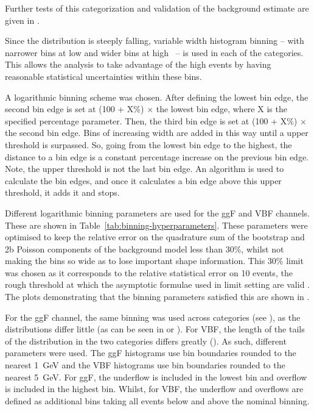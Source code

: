 Further tests of this categorization and validation of the background estimate are given in \Sect{\ref{sec:bkgvalidation}}.

Since the \mhh distribution is steeply falling, variable width histogram binning -- with narrower bins at low \mhh and wider bins at high \mhh\ -- is used in each of the categories. This allows the analysis to take advantage of the high \mhh events by having reasonable statistical uncertainties within these bins.

A logarithmic binning scheme was chosen. After defining the lowest bin edge, the second bin edge is set at (100 + X\%) $\times$ the lowest bin edge, where X is the specified percentage parameter. Then, the third bin edge is set at (100 + X\%) $\times$ the second bin edge. Bins of increasing width are added in this way until a upper threshold is surpassed. So, going from the lowest bin edge to the highest, the distance to a bin edge is a constant percentage increase on the previous bin edge. Note, the upper threshold is not the last bin edge. An algorithm is used to calculate the bin edges, and once it calculates a bin edge above this upper threshold, it adds it and stops.

Different logarithmic binning parameters are used for the ggF and VBF channels. These are shown in Table~\ref{tab:binning-hyperparameters}. These parameters were optimised to keep the relative error on the quadrature sum of the bootstrap and 2b Poisson components of the background model less than 30\%, whilst not making the bins so wide as to lose important shape information. This 30\% limit was chosen as it corresponds to the relative statistical error on 10 events, the rough threshold at which the asymptotic formulae used in limit setting are valid \cite{Cowan:2010js}. The plots demonstrating that the binning parameters satisfied this are shown in \App{\ref{app:binning}}.

For the ggF channel, the same binning was used across categories (see \Sect{\ref{subsubsec:ggF-cats}}), as the \mhh distributions differ little (as can be seen in \Fig{\ref{fig:ggF-4b-disc-log}} or \Fig{\ref{fig:ggF-4b-disc}}). For VBF, the length of the tails of the \mhh distribution in the two \deta categories differs greatly (\Fig{\ref{fig:vbf-mhh-same}}). As such, different parameters were used. The ggF histograms use bin boundaries rounded to the nearest 1~GeV and the VBF histograms use bin boundaries rounded to the nearest 5~GeV. For ggF, the underflow is included in the lowest bin and overflow is included in the highest bin. Whilst, for VBF, the underflow and overflows are defined as additional bins taking all events below and above the nominal binning.

